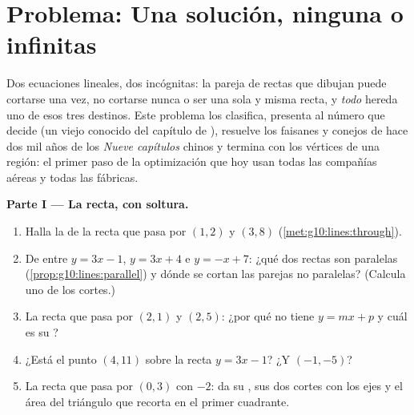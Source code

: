 \section{Problema: Una solución, ninguna o infinitas}

\begin{problem}
\label{pb:g10:lines:1}
Dos ecuaciones lineales, dos incógnitas: la pareja de rectas que dibujan
puede cortarse una vez, no cortarse nunca o ser una sola y misma recta, y
\emph{todo}  hereda uno de esos tres destinos. Este problema
los clasifica, presenta al número que decide (un viejo conocido del
capítulo de ), resuelve los faisanes y conejos de hace dos mil años
de los \emph{Nueve capítulos} chinos y termina con los vértices de una
región: el primer paso de la optimización que hoy usan todas las compañías
aéreas y todas las fábricas.

\medskip
\noindent\textbf{Parte I --- La recta, con soltura.}
\begin{enumerate}
  \item Halla la  de la recta que pasa por $(1, 2)$ y
        $(3, 8)$ (\cref{met:g10:lines:through}).
  \item De entre $y = 3x - 1$, $y = 3x + 4$ e $y = -x + 7$: ¿qué dos
        rectas son paralelas (\cref{prop:g10:lines:parallel}) y dónde se
        cortan las parejas no paralelas? (Calcula uno de los cortes.)
  \item La recta que pasa por $(2, 1)$ y $(2, 5)$: ¿por qué no tiene
         $y = mx + p$ y cuál es su ?
  \item ¿Está el punto $(4, 11)$ sobre la recta $y = 3x - 1$? ¿Y
        $(-1, -5)$?
  \item La recta que pasa por $(0, 3)$ con  $-2$: da su ,
        sus dos cortes con los ejes y el área del triángulo que recorta en
        el primer cuadrante.
\end{enumerate}


\end{problem}

